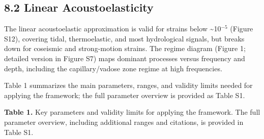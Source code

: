 \documentclass[draft]{agujournal2019}
\begin{document}
\subsection{8.2 Linear
Acoustoelasticity}\label{linear-acoustoelasticity}

The linear acoustoelastic approximation is valid for strains below
\textasciitilde{}10\(^{-5}\) (Figure S12), covering tidal,
thermoelastic, and most hydrological signals, but breaks down for
coseismic and strong-motion strains. The regime diagram (Figure 1;
detailed version in Figure S7) maps dominant processes versus frequency
and depth, including the capillary/vadose zone regime at high
frequencies.

Table 1 summarizes the main parameters, ranges, and validity limits
needed for applying the framework; the full parameter overview is
provided as Table S1.

\textbf{Table 1.} Key parameters and validity limits for applying the
framework. The full parameter overview, including additional ranges and
citations, is provided in Table S1.
\end{document}
